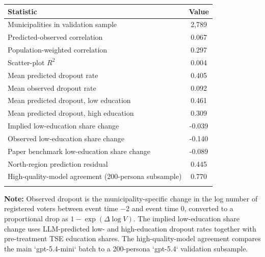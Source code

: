 \begin{tabular*}{\textwidth}{@{\extracolsep{\fill}}lc}
\doubletoprule
Statistic & Value \\
\midrule
Municipalities in validation sample & 2,789 \\
Predicted-observed correlation & 0.067 \\
Population-weighted correlation & 0.297 \\
Scatter-plot $R^2$ & 0.004 \\
Mean predicted dropout rate & 0.405 \\
Mean observed dropout rate & 0.092 \\
Mean predicted dropout, low education & 0.461 \\
Mean predicted dropout, high education & 0.309 \\
Implied low-education share change & -0.039 \\
Observed low-education share change & -0.140 \\
Paper benchmark low-education share change & -0.089 \\
North-region prediction residual & 0.445 \\
High-quality-model agreement (200-persona subsample) & 0.770 \\
\doublebottomrule
\end{tabular*}

\begin{minipage}{\textwidth}
\footnotesize
\textbf{Note:} Observed dropout is the municipality-specific change in the log number of registered voters between event time $-2$ and event time $0$, converted to a proportional drop as $1 - \exp(\Delta \log V)$. The implied low-education share change uses LLM-predicted low- and high-education dropout rates together with pre-treatment TSE education shares. The high-quality-model agreement compares the main `gpt-5.4-mini` batch to a 200-persona `gpt-5.4` validation subsample.
\end{minipage}
